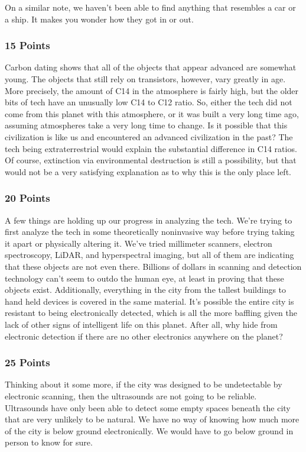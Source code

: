 \documentclass[conference]{IEEEtran}
\begin{document}
On a similar note, we haven’t been able to find anything that resembles a car or a ship. It makes you wonder how they got in or out.

\subsubsection*{15 Points}
Carbon dating shows that all of the objects that appear advanced are somewhat young. The objects that still rely on transistors, however, vary greatly in age. More precisely, the amount of C14 in the atmosphere is fairly high, but the older bits of tech have an unusually low C14 to C12 ratio. So, either the tech did not come from this planet with this atmosphere, or it was built a very long time ago, assuming atmospheres take a very long time to change. Is it possible that this civilization is like us and encountered an advanced civilization in the past? The tech being extraterrestrial would explain the substantial difference in C14 ratios. Of course, extinction via environmental destruction is still a possibility, but that would not be a very satisfying explanation as to why this is the only place left.

\subsubsection*{20 Points}
A few things are holding up our progress in analyzing the tech. We’re trying to first analyze the tech in some theoretically noninvasive way before trying taking it apart or physically altering it. We’ve tried millimeter scanners, electron spectroscopy, LiDAR, and hyperspectral imaging, but all of them are indicating that these objects are not even there. Billions of dollars in scanning and detection technology can’t seem to outdo the human eye, at least in proving that these objects exist. Additionally, everything in the city from the tallest buildings to hand held devices is covered in the same material. It’s possible the entire city is resistant to being electronically detected, which is all the more baffling given the lack of other signs of intelligent life on this planet. After all, why hide from electronic detection if there are no other electronics anywhere on the planet?

\subsubsection*{25 Points}
Thinking about it some more, if the city was designed to be undetectable by electronic scanning, then the ultrasounds are not going to be reliable. Ultrasounds have only been able to detect some empty spaces beneath the city that are very unlikely to be natural.  We have no way of knowing how much more of the city is below ground electronically. We would have to go below ground in person to know for sure. 
\end{document}
